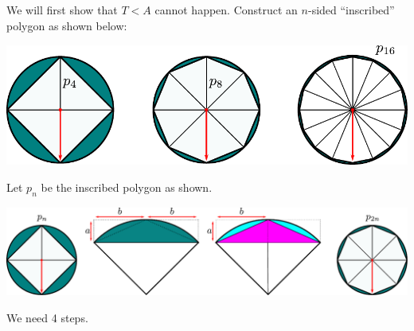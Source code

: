 We will first show that $T<A$ cannot happen. Construct an $n$-sided ``inscribed'' polygon
as shown below:
\begin{center}
 \includegraphics[height=4cm]{archimedes2}
\end{center}
Let $p_n$ be the inscribed polygon as shown.
\begin{center}
 \includegraphics[width=\textwidth]{archimedes3}
\end{center}
We need 4 steps.
